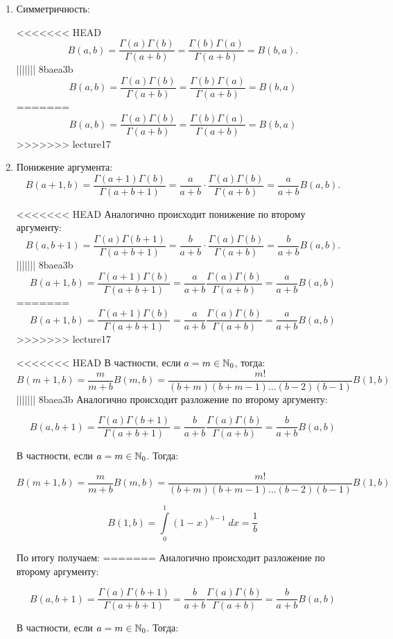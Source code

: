 \documentclass[../../main.tex]{subfiles}
\begin{document}
\begin{enumerate}
	\item Симметричность: 
	
<<<<<<< HEAD
	\[  B(a,b) = \frac{\Gamma(a) \Gamma(b)}{\Gamma(a+b)} = \frac{\Gamma(b)  
	\Gamma(a) }{\Gamma(a+b)} = B(b,a).   \]
||||||| 8baea3b
	\[  B(a,b) = \frac{\Gamma(a) \Gamma(b)}{\Gamma(a+b)} = \frac{\Gamma(b)  \Gamma(a) }{\Gamma(a+b)} = B(b,a)   \]
=======
	\[  B(a,b) = \frac{\Gamma(a) \Gamma(b)}{\Gamma(a+b)} = \frac{\Gamma(b)  
	\Gamma(a) }{\Gamma(a+b)} = B(b,a)   \]
>>>>>>> lecture17
	
	\item Понижение аргумента:
	\[   B(a+1,b) = \frac{\Gamma(a+1) \Gamma(b)}{\Gamma(a+b+1)}  = \frac{a}{a+b} 
	\cdot \frac{\Gamma(a) \Gamma(b)}{\Gamma(a+b)}  = \frac{a}{a+b}  B(a,b). \]
	
<<<<<<< HEAD
	Аналогично происходит понижение по второму аргументу:
	\[  B(a,b+1) =  \frac{\Gamma(a) \Gamma(b+1)}{\Gamma(a+b+1)}  = \frac{b}{a+b} 
	\cdot \frac{\Gamma(a) \Gamma(b)}{\Gamma(a+b)}  = \frac{b}{a+b}  B(a,b). \]
||||||| 8baea3b
	\[   B(a+1,b) = \frac{\Gamma(a+1) \Gamma(b)}{\Gamma(a+b+1)}  = \frac{a}{a+b} \frac{\Gamma(a) \Gamma(b)}{\Gamma(a+b)}  = \frac{a}{a+b}  B(a,b) \]
=======
	\[   B(a+1,b) = \frac{\Gamma(a+1) \Gamma(b)}{\Gamma(a+b+1)}  = \frac{a}{a+b} 
	\frac{\Gamma(a) \Gamma(b)}{\Gamma(a+b)}  = \frac{a}{a+b}  B(a,b) \]
>>>>>>> lecture17
	
<<<<<<< HEAD
	В частности, если $a=m \in \mathbb{N}_0$, тогда:
	\[  B(m+1,b) = \frac{m}{m+b} B(m,b) = \frac{m!}{(b+m)(b+m-1)\dots(b-2)(b-1)} 
	B(1,b)  \]
||||||| 8baea3b
	Аналогично происходит разложение по второму аргументу:
	
	\[  B(a,b+1) =  \frac{\Gamma(a) \Gamma(b+1)}{\Gamma(a+b+1)}  = \frac{b}{a+b} \frac{\Gamma(a) \Gamma(b)}{\Gamma(a+b)}  = \frac{b}{a+b}  B(a,b)   \]
	
	В частности, если $a=m \in \mathbb{N}_0$. Тогда:
	
	\[  B(m+1,b) = \frac{m}{m+b} B(m,b) = \frac{m!}{(b+m)(b+m-1)\dots(b-2)(b-1)} B(1,b)  \]
	
	\[ B(1,b) = \int\limits_{0}^{1} \left( 1-x \right) ^{b-1} \; dx = \frac{1}{b} \]
	
	По итогу получаем:
=======
	Аналогично происходит разложение по второму аргументу:
	
	\[  B(a,b+1) =  \frac{\Gamma(a) \Gamma(b+1)}{\Gamma(a+b+1)}  = \frac{b}{a+b} 
	\frac{\Gamma(a) \Gamma(b)}{\Gamma(a+b)}  = \frac{b}{a+b}  B(a,b)   \]
	
	В частности, если $a=m \in \mathbb{N}_0$. Тогда:
	

\end{enumerate}
\end{document}
